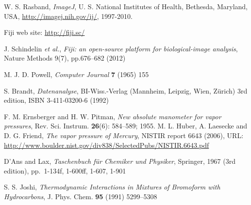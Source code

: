 \documentclass[fleqn]{scrartcl}
\begin{document}
\begin{thebibliography}{9}

 W. S. Rasband, \textit{ImageJ}, U. S. National
  Institutes of Health, Bethesda, Maryland, USA,
  \url{http://imagej.nih.gov/ij/}, 1997-2010.
  
 Fiji web site: \url{http://fiji.sc/}

 J. Schindelin \textit{et al.}, \textit{Fiji: an
    open-source platform for biological-image analysis}, Nature
  Methods 9(7), pp.676--682 (2012)

 M. J. D. Powell, \textit{Computer Journal}
  \textbf{7} (1965) 155

 S. Brandt, \textit{Datenanalyse}, BI-Wiss.-Verlag
  (Mannheim, Leipzig, Wien, Zürich) 3rd edition, ISBN 3-411-03200-6
  (1992)

 F. M. Ernsberger and H. W. Pitman, \textit{New
    absolute manometer for vapor pressures}, Rev. Sci. Instrum.
  \textbf{26}(6): 584--589; 1955. M. L. Huber, A. Laesecke and D. G.
  Friend, \textit{The vapor pressure of Mercury}, NISTIR report 6643
  (2006), URL:
  \url{http://www.boulder.nist.gov/div838/SelectedPubs/NISTIR.6643.pdf}

%
% 
 D'Ans and Lax, \textit{Taschenbuch für Chemiker und
    Physiker}, Springer, 1967 (3rd edition), pp.~1-134f, 1-600ff,
  1-607, 1-901

 S. S. Joshi, \textit{Thermodynamic Interactions in Mixtures of Bromoform with Hydrocarbons}, J. Phys. Chem. \textbf{95} (1991) 5299--5308

%
%
%


\end{thebibliography}
\end{document}
